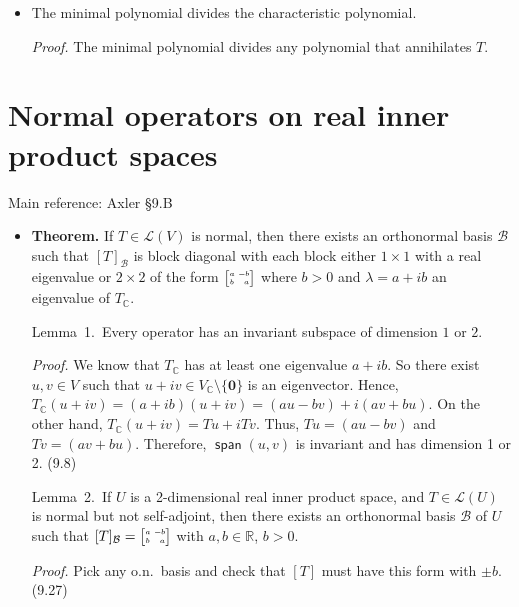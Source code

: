 \documentclass[11pt]{article}
\newcommand{\1}{\mathbf{1}}
\newcommand{\0}{\mathbf{0}}
\newcommand{\C}{\mathbb{C}}
\newcommand{\F}{\mathbb{F}}
\newcommand{\cL}{\mathcal{L}}
\newcommand{\R}{\mathbb{R}}
\DeclareMathOperator{\myspan}{\mathsf{span}}
\newcommand{\abba}{{\tiny \begin{bmatrix} a \ {-\!\!\;b} \\ b \ \ \ a \end{bmatrix}}}
\renewcommand{\geq}{\geqslant}
\begin{document}
{\begin{itemize}
\emph{Proof.}
By the complex Cayley-Hamilton Theorem,
$[p(T)] = p([T]) = p([T_\C])=\0$.

\item

The minimal polynomial divides the characteristic polynomial.

\emph{Proof.}
The minimal polynomial divides any polynomial that annihilates $T$.

\end{itemize}


\clearpage
\section{Normal operators on real inner product spaces}

Main reference:
Axler \S9.B

\begin{itemize}

\item

\textbf{Theorem.}
If $T \in \cL(V)$ is normal, then there exists an orthonormal basis $\mathcal{B}$ such that $[T]_{\mathcal{B}}$ is block diagonal with
each block either $1 \times 1$ with a real eigenvalue or $2 \times 2$ of the form
\(
\abba
\)
where $b>0$ and $\lambda = a + ib$ an eigenvalue of $T_\C$.

Lemma~1.\
Every operator has an invariant subspace of dimension $1$ or $2$.

\emph{Proof.}
We know that $T_\C$ has at least one eigenvalue $a+ib$.
So there exist $u,v \in V$ such that $u+iv \in V_\C \setminus \{\0\}$ is an eigenvector.
Hence, $T_\C(u+iv) = (a+ib) (u+iv) = (au - bv) + i(av + bu)$.
On the other hand, $T_\C(u+iv) = Tu + i Tv$.
Thus, $Tu = (au - bv)$ and $Tv = (av + bu)$.
Therefore, $\myspan(u,v)$ is invariant and has dimension 1 or 2.
\hfill
(9.8)

Lemma~2.\
If $U$ is a 2-dimensional real inner product space, and $T\in\mathcal{L}(U)$ is normal but not self-adjoint, then there exists an orthonormal basis $\mathcal{B}$ of $U$ such that
\(
[T]_{\mathcal{B}} =
\abba
\)
with $a,b\in\mathbb{R}$, $b>0$.

\emph{Proof.}
Pick any o.n.\ basis and check that
$[T]$ must have this form with $\pm b$.
\hfill
(9.27)


\end{itemize}}
\end{document}
